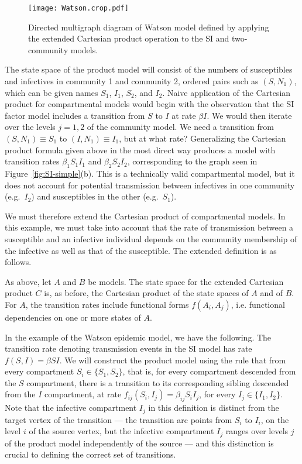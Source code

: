 \documentclass[review]{elsarticle}
\newcommand{\hl}[1]{#1}
\begin{document}
\begin{figure}
\centering
\texttt{[image: Watson.crop.pdf]}
%
\caption{ \label{fig:Watson}
Directed multigraph diagram of
Watson model \cite{watson72} defined by applying
the extended Cartesian product operation to the SI
and two-community models.
}
\end{figure}

The state space of the product model
will consist of the numbers of susceptibles and infectives
in community 1 and community 2, 
ordered pairs such as $(S,N_1)$, which can be given names
$S_1$, $I_1$, $S_2$, and $I_2$.
Naive application of the Cartesian product for compartmental
models would begin with the observation that
the SI factor model includes a transition from $S$ to
$I$ at rate $\beta I$.  We would then iterate over
the levels $j=1, 2$ of the community model.  We need a transition
from $(S,N_1)\equiv S_1$ to $(I,N_1)\equiv I_1$, but at
what rate?  
Generalizing the Cartesian product formula given above
in the most direct way produces a model with transition
rates $\beta_1 S_1 I_1$ and $\beta_2 S_2 I_2$,
corresponding to the graph seen in \hl{Figure~\mbox{\ref{fig:SI-simple}(b)}}.
This is a technically valid compartmental model, but
it does not account for potential transmission between
infectives in one community (e.g.\ $I_2$)
and susceptibles in the other (e.g.\ $S_1$).

We must therefore extend the Cartesian product of 
compartmental models.  
In this example, we must take into account that the rate of transmission
between a susceptible and an infective individual
depends on the community membership of the infective as well
as that of the susceptible.
The extended definition is as follows.

As above, let $A$ and $B$ be
models.  The state space for the extended Cartesian product $C$ is, as
before, the Cartesian product of the state spaces of $A$ and of $B$.  
For $A$, the transition rates include functional forms
$f(A_i,A_j)$, i.e. functional dependencies on one or more
states of $A$.

In the example of the Watson epidemic model, we have the following.
The transition rate denoting transmission events in the SI model
has rate $f(S,I)=\beta S I$.
We will construct the product model using the rule that
from every compartment $S_i\in\{S_1,S_2\}$, that is,
for every compartment descended from the $S$ compartment,
there is a transition to its corresponding sibling descended
from the $I$ compartment, at rate
$f_{ij}(S_i,I_j)=\beta_{ij}S_iI_j$,
for every $I_j\in\{I_1,I_2\}$.
Note that the infective compartment $I_j$ in this definition
is distinct from the target vertex of the transition ---
the transition arc points from $S_i$ to $I_i$,
on the level $i$ of the source vertex,
but the infective compartment $I_j$ ranges over levels $j$
of the product model independently of the source ---
and this distinction is crucial to defining the correct
set of transitions.
\end{document}
